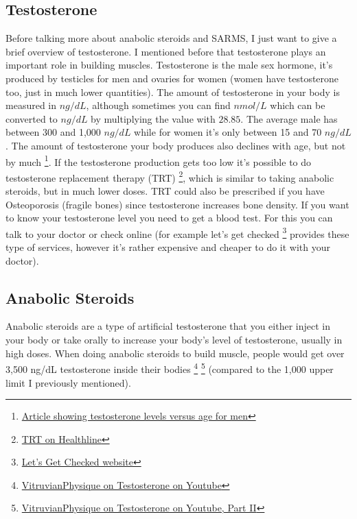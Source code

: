 \documentclass[openany, 12pt]{book}
\begin{document}
        \subsection{Testosterone}
        
        Before talking more about anabolic steroids and SARMS, I just want to give a brief overview of testosterone. I mentioned before that testosterone plays an important role in building muscles.
        Testosterone is the male sex hormone, it's produced by testicles for men and ovaries for women (women have testosterone too, just in much lower quantities).
        The amount of testosterone in your body is measured in $ng/dL$, although sometimes you can find $nmol/L$ which can be converted to $ng/dL$ by multiplying the value with $28.85$.
        The average male has between 300 and 1,000 $ng/dL$ while for women it's only between 15 and 70 $ng/dL$. The amount of testosterone your body produces also declines with age, but not by much
        \footnote{\href{https://pubmed.ncbi.nlm.nih.gov/25295520/}{Article showing testosterone levels versus age for men}}. If the testosterone production gets too low it's possible to
        do testosterone replacement therapy (TRT)
        \footnote{\href{https://www.healthline.com/health/trt/}{TRT on Healthline}}, which is similar to taking anabolic steroids, but in much lower doses. TRT could also be prescribed if
        you have Osteoporosis (fragile bones) since testosterone increases bone density.
        If you want to know your testosterone level you need to get a blood test. For this you can talk to your doctor or check online (for example let's get checked
        \footnote{\href{https://www.letsgetchecked.co.uk/}{Let's Get Checked website}}
        provides these type of services, however it's rather expensive and cheaper to do it with your doctor).

        \subsection{Anabolic Steroids}

        Anabolic steroids are a type of artificial testosterone that you either inject in your body or take orally to increase your body's level of testosterone, usually in high doses.
        When doing anabolic steroids to build muscle, people would get over 3,500 ng/dL testosterone inside their bodies
        \footnote{\href{https://www.youtube.com/watch?v=Oml-f1yUz2w}{VitruvianPhysique on Testosterone on Youtube}}
        \footnote{\href{https://www.youtube.com/watch?v=UKcEHtm8MFA}{VitruvianPhysique on Testosterone on Youtube, Part II}}
        (compared to the 1,000 upper limit I previously mentioned). 
\end{document}
